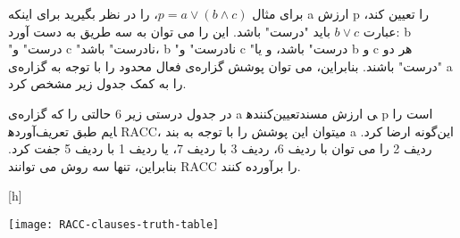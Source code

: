 برای مثال
 $p = a \vee (b \wedge c)$،
 را در نظر بگیرید برای اینکه a ارزش p را تعیین کند، عبارت
$ b \vee c$
 باید "درست" باشد. این را می توان به سه طریق به دست آورد: b "درست" و c "نادرست" باشد، b "نادرست" و c "درست" باشد، و یا b و c هر دو "درست" باشند. بنابراین، می توان پوشش گزاره‌ی فعال محدود را با توجه به گزاره‌ی a را به کمک جدول زیر مشخص کرد. 
 
در جدول درستی زیر 6 حالتی را که گزاره‌ی a تعیین‌کننده‎ی ارزش مسند p است را آورده‎ایم طبق تعریف RACC، میتوان این پوشش را با توجه به بند a این‌گونه ارضا کرد. ردیف 2 را می توان با ردیف 6، ردیف 3 با ردیف 7، یا ردیف 1 با ردیف 5 جفت کرد. بنابراین، تنها سه روش می توانند RACC را برآورده کنند.

[h]
\raggedright
\texttt{[image: RACC-clauses-truth-table]}
\vspace{0.1em}



